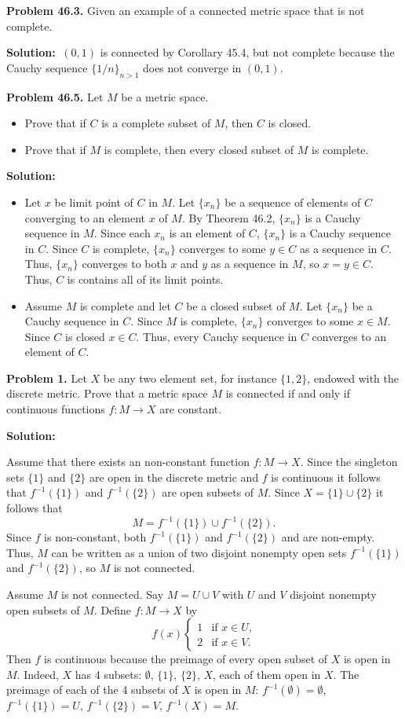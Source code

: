\documentclass[12pt]{article}
\def\black{\color{black}}
\def\green{\color{rltgreen}}
\newcommand\bi{\begin{itemize}}
\newcommand\ei{\end{itemize}}
\newcommand\itema{\item[(a)]}
\newcommand\itemb{\item[(b)]}
\renewcommand\|{\ | \ }
\newcommand\ra{\rightarrow}
\def\manylinedefinition#1{
\left\{\begin{array}{ll}
#1
\end{array}\right.
}
\def\pb#1{{\green \bf Problem #1.}\hskip 8pt \black}
\def\sol{\textbf{Solution:}}
\def\sequence#1{$\{{#1}_n\}$}
\begin{document}
\pb{46.3}
Given an example of a connected metric space that is not complete.

\sol
$\ (0, 1)$ is connected by Corollary 45.4, but not complete because the Cauchy
sequence $\{1/n\}_{n > 1}$ does not converge in $(0, 1)$.


\pb{46.5}
Let $M$ be a metric space.
\bi
\itema
Prove that if $C$ is a complete subset of $M$, then $C$ is closed.
\itemb
Prove that if $M$ is complete, then every closed subset of $M$ is complete.
\ei

\sol
\bi
\itema
Let $x$ be limit point of $C$ in $M$.
Let \sequence x be a sequence of elements of $C$ converging to an element
$x$ of $M$. By Theorem 46.2, \sequence x is a Cauchy sequence in $M$.
Since each $x_n$ is an element of $C$, \sequence x is a Cauchy sequence
in $C$. Since $C$ is complete, \sequence x converges to some $y \in C$
as a sequence in $C$. Thus, \sequence x converges to both $x$ and $y$ as
a sequence in $M$, so $x = y \in C$. Thus, $C$ is contains all of its limit
points.
\itemb
Assume $M$ is complete and let $C$ be a closed subset of $M$. Let
\sequence x be a Cauchy sequence in $C$. Since $M$ is complete, 
\sequence x converges to some $x \in M$. Since $C$ is closed
$x \in C$. Thus, every Cauchy sequence in $C$ converges to an element of $C$.
\ei



\pb{1}
Let $X$ be any two element set, for instance $\{1, 2\}$, endowed with the
discrete metric. Prove that a metric space $M$ is connected if and only if
continuous functions $f: M \ra X$ are constant.

\sol

Assume that there exists an non-constant function $f: M \ra X$. 
Since the singleton sets $\{1\}$ and $\{2\}$ are open in the discrete metric
and $f$ is continuous it follows that $f^{-1}(\{1\})$ and $f^{-1}(\{2\})$ are
open subsets of $M$. Since $X = \{1\} \cup \{2\}$ it follows that 
\[
M = f^{-1}(\{1\}) \cup f^{-1}(\{2\}).
\]
Since $f$ is non-constant, both $f^{-1}(\{1\})$ and $f^{-1}(\{2\})$ and
are non-empty. Thus, $M$ can be written as a union of two disjoint nonempty 
open sets $f^{-1}(\{1\})$ and $f^{-1}(\{2\})$, so $M$ is not connected.

Assume $M$ is not connected. Say $M = U \cup V$ with $U$ and $V$ disjoint
nonempty open subsets of $M$. Define $f: M \ra X$ by
\[
f(x) \manylinedefinition{ 
	1 & \text{if $x \in U$,} \\
    2 & \text{if $x \in V$.}
}
\]
Then $f$ is continuous because the preimage of every open subset of $X$
is open in $M$. Indeed, $X$ has 4 subsets: $\emptyset$, $\{1\}$, $\{2\}$, $X$,
each of them open in $X$. The preimage of each of the 4 subsets of $X$ 
is open in $M$: $f^{-1}(\emptyset) = \emptyset$, $f^{-1}(\{1\}) = U$,
$f^{-1}(\{2\}) = V$, $f^{-1}(X) = M$.
\end{document}
